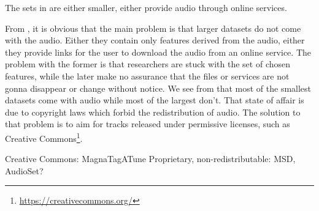 \documentclass{article}
\begin{document}



The sets in  are either smaller, either provide audio through online services.

From , it is obvious that the main problem is that larger datasets do not come with the audio. Either they contain only features derived from the audio, either they provide links for the user to download the audio from an online service. The problem with the former is that researchers are stuck with the set of chosen features, while the later make no assurance that the files or services are not gonna disappear or change without notice.
We see from  that most of the smallest datasets come with audio while most of the largest don't. That state of affair is due to copyright laws which forbid the redistribution of audio. The solution to that problem is to aim for tracks released under permissive licenses, such as Creative Commons\footnote{\url{https://creativecommons.org/}}.

Creative Commons: MagnaTagATune
Proprietary, non-redistributable: MSD, AudioSet?
\end{document}
